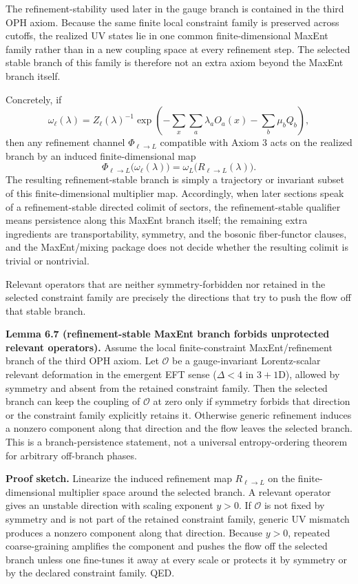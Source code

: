 The refinement-stability used later in the gauge branch is contained in the third OPH axiom. Because the same finite local constraint family is preserved across cutoffs, the realized UV states lie in one common finite-dimensional MaxEnt family rather than in a new coupling space at every refinement step. The selected stable branch of this family is therefore not an extra axiom beyond the MaxEnt branch itself.

Concretely, if
\[
\omega_\ell(\lambda)
=
Z_\ell(\lambda)^{-1}
\exp\!\left(
-\sum_x \sum_a \lambda_a O_a(x)-\sum_b \mu_b Q_b
\right),
\]
then any refinement channel \(\Phi_{\ell\to L}\) compatible with Axiom 3 acts on the realized branch by an induced finite-dimensional map
\[
\Phi_{\ell\to L}\bigl(\omega_\ell(\lambda)\bigr)
=
\omega_L\!\bigl(R_{\ell\to L}(\lambda)\bigr).
\]
The resulting refinement-stable branch is simply a trajectory or invariant subset of this finite-dimensional multiplier map. Accordingly, when later sections speak of a refinement-stable directed colimit of sectors, the refinement-stable qualifier means persistence along this MaxEnt branch itself; the remaining extra ingredients are transportability, symmetry, and the bosonic fiber-functor clauses, and the MaxEnt/mixing package does not decide whether the resulting colimit is trivial or nontrivial.

Relevant operators that are neither symmetry-forbidden nor retained in the selected constraint family are precisely the directions that try to push the flow off that stable branch.

\textbf{Lemma 6.7 (refinement-stable MaxEnt branch forbids unprotected relevant operators).} Assume the local finite-constraint MaxEnt/refinement branch of the third OPH axiom. Let \(\mathcal{O}\) be a gauge-invariant Lorentz-scalar relevant deformation in the emergent EFT sense (\(\Delta<4\) in \(3+1\)D), allowed by symmetry and absent from the retained constraint family. Then the selected branch can keep the coupling of \(\mathcal{O}\) at zero only if symmetry forbids that direction or the constraint family explicitly retains it. Otherwise generic refinement induces a nonzero component along that direction and the flow leaves the selected branch. This is a branch-persistence statement, not a universal entropy-ordering theorem for arbitrary off-branch phases.

\textbf{Proof sketch.} Linearize the induced refinement map \(R_{\ell\to L}\) on the finite-dimensional multiplier space around the selected branch. A relevant operator gives an unstable direction with scaling exponent \(y>0\). If \(\mathcal{O}\) is not fixed by symmetry and is not part of the retained constraint family, generic UV mismatch produces a nonzero component along that direction. Because \(y>0\), repeated coarse-graining amplifies the component and pushes the flow off the selected branch unless one fine-tunes it away at every scale or protects it by symmetry or by the declared constraint family. QED.


